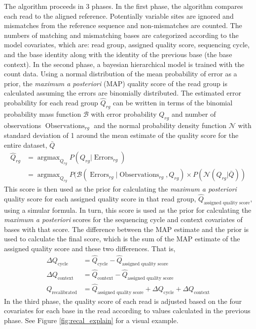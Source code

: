 The algorithm proceeds in 3 phases.
In the first phase, the algorithm compares each read to the aligned reference. Potentially variable sites are ignored and mismatches from the reference sequence and non-mismatches are counted. The numbers of matching and mismatching bases are categorized according to the model covariates, which are: read group, assigned quality score, sequencing cycle, and the base identity along with the identity of the previous base (the base context).
In the second phase, a bayesian hierarchical model is trained with the count data. Using a normal distribution of the mean probability of error as a prior, the \textit{maximum a posteriori} (MAP) quality score of the read group is calculated assuming the errors are binomially distributed. The estimated error probability for each read group $\hat{Q}_{rg}$ can be written in terms of the binomial probability mass function $\mathcal{B}$ with error probability $Q_{rg}$ and number of observations $\operatorname{Observations}_{rg}$ and the normal probability density function $\mathcal{N}$ with standard deviation of 1 around the mean estimate of the quality score for the entire dataset, $\bar{Q}$
\begin{align}
\hat{Q}_{rg} &= \operatorname{argmax}_{Q_{rg}} P(Q_{rg}|\operatorname{Errors}_{rg}) \\
&= \operatorname{argmax}_{Q_{rg}} P(\mathcal{B}(\operatorname{Errors}_{rg} | \operatorname{Observations}_{rg}, Q_{rg}) \times P(\mathcal{N}(Q_{rg} | \bar{Q}))
\end{align}
This score is then used as the prior for calculating the \textit{maximum a posteriori} quality score for each assigned quality score in that read group, $\hat{Q}_{\operatorname{assigned\:quality\:score}}$, using a simular formula.
In turn, this score is used as the prior for calculating the \textit{maximum a posteriori} scores for the sequencing cycle and context covariates of bases with that score. The difference between the MAP estimate and the prior is used to calculate the final score, which is the sum of the MAP estimate of the assigned quality score and these two differences. That is,
\begin{align}
\Delta Q_{\operatorname{cycle}} &= \hat{Q}_{\operatorname{cycle}} - \hat{Q}_{\operatorname{assigned\:quality\:score}} \\
\Delta Q_{\operatorname{context}} &= \hat{Q}_{\operatorname{context}} - \hat{Q}_{\operatorname{assigned\:quality\:score}} \\
Q_{\operatorname{recalibrated}} &= \hat{Q}_{\operatorname{assigned\:quality\:score}} + \Delta Q_{\operatorname{cycle}} + \Delta Q_{\operatorname{context}}
\end{align}
In the third phase, the quality score of each read is adjusted based on the four covariates for each base in the read according to values calculated in the previous phase. See Figure \ref{fig:recal_explain} for a visual example.

